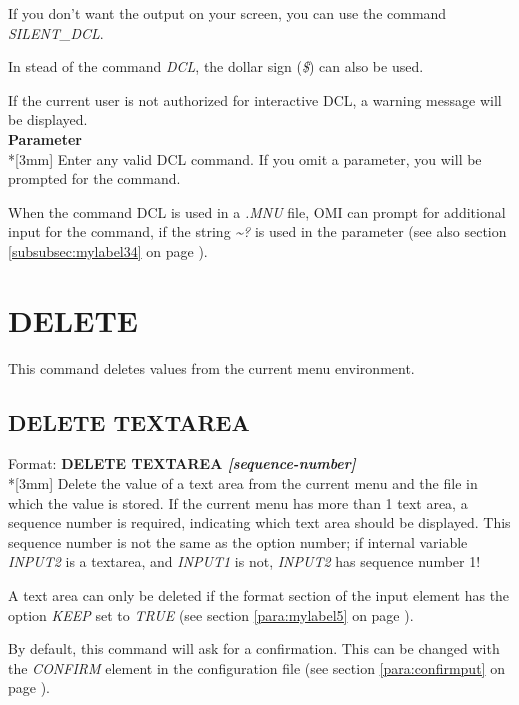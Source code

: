 \documentclass[a4paper]{book}
\newcommand{\vs}{\vspace{3mm}}
\renewcommand{\indent}{\hspace*{5mm}}
\begin{document}
If you don't want the output on your screen, you can use the command 
\textsl{SILENT{\_}DCL}.

\vs

In stead of the command \textsl{DCL}, the dollar sign 
(\textsl{{\$}})\index{{\$}} can also be used.

\vs

If the current user is not authorized for interactive DCL, a warning message 
will be displayed.\\[3mm]
\textbf{Parameter}\\*[3mm]
Enter any valid DCL command. If you omit a parameter, you will be prompted 
for the command.

When the command DCL is used in a \textsl{.MNU} file, OMI can prompt for additional 
input for the command, if the string \textsl{\~{}?} is used in the parameter
(see also section \ref{subsubsec:mylabel34} on page \pageref{para:dyninput}).

\section{DELETE}
\label{subsec:delete}

This command deletes values from the current menu environment.

\subsection{DELETE TEXTAREA}
\label{subsubsec:delete}

\indent Format: \textbf{DELETE TEXTAREA \textit{[sequence-number]}}\\*[3mm]
Delete the value of a text area from the current menu and the file in which 
the value is stored. If the current menu has more than 1 text area, a 
sequence number is required, indicating which text area should be displayed. 
This sequence number is not the same as the option number; if internal 
variable \textsl{INPUT2} is a textarea, and \textsl{INPUT1} is not, \textsl{INPUT2} has sequence number 1!

A text area can only be deleted if the format section of the input element 
has the option \textsl{KEEP} set to \textsl{TRUE} (see section \ref{para:mylabel5} on page \pageref{para:mylabel5}).

\vs

By default, this command will ask for a confirmation. This can be changed 
with the \textsl{CONFIRM} element in the configuration file (see section 
\ref{para:confirmput} on page \pageref{para:confirmput}).
\end{document}
